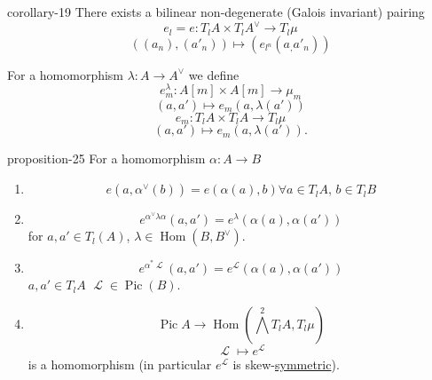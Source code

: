 \documentclass[10pt,]{book}
\numberwithin{equation}{section}
\newcommand{\sheaf}[1]{\operatorname{\mathcal{#1}}}
\DeclareMathOperator{\Hom}{Hom}
\DeclareMathOperator{\Pic}{Pic}
\begin{document}
\begin{corollary}{}{}{corollary-19}%
\hypertarget{p-303}{}%
There exists a bilinear non-degenerate (Galois invariant) pairing%
\begin{equation*}
e_l = e \colon T_lA \times T_lA^\vee \to T_l\mu
\end{equation*}
%
\begin{equation*}
((a_n), (a'_n)) \mapsto (e_{l^n}(a_,a'_n))
\end{equation*}
%
\end{corollary}
\hypertarget{p-304}{}%
For a homomorphism \(\lambda \colon A \to A^\vee\) we define%
\begin{equation*}
e_m^\lambda \colon A[m]\times A [m] \to \mu_m
\end{equation*}
%
\begin{equation*}
(a,a') \mapsto e_m(a, \lambda(a'))
\end{equation*}
%
\begin{equation*}
e_m \colon T_lA\times T_l A \to T_l \mu
\end{equation*}
%
\begin{equation*}
(a,a') \mapsto e_m(a, \lambda(a'))\text{.}
\end{equation*}
%
\label{notation-2}
\begin{proposition}{}{}{proposition-25}%
\hypertarget{p-306}{}%
For a homomorphism \(\alpha \colon A \to B\)\leavevmode%
\begin{enumerate}
\item\hypertarget{li-48}{}%
\begin{equation*}
e(a,\alpha^\vee(b)) = e(\alpha (a), b) \forall a \in T_lA,\,b\in T_l B
\end{equation*}
%
\item\hypertarget{li-49}{}%
\begin{equation*}
e^{\alpha^\vee \lambda \alpha}(a,a') = e ^\lambda (\alpha(a), \alpha(a'))
\end{equation*}
for \(a,a' \in T_l(A)\), \(\lambda \in \Hom(B,B^\vee)\).%
\item\hypertarget{li-50}{}%
\begin{equation*}
e^{\alpha^* \sheaf L} (a,a') = e^{\sheaf L}(\alpha (a),\alpha(a'))
\end{equation*}
\(a,a'\in T_lA\) \(\sheaf L\in \Pic(B)\).%
\item\hypertarget{li-51}{}%
\begin{equation*}
\Pic A  \to \Hom( \bigwedge^2 T_lA , T_l\mu)
\end{equation*}
%
\begin{equation*}
\sheaf L \mapsto e^{\sheaf L}
\end{equation*}
is a homomorphism (in particular \(e^{\sheaf L}\) is  skew-\hyperref[def-princ-pol]{symmetric}).%
\end{enumerate}
%
\end{proposition}
\end{document}
